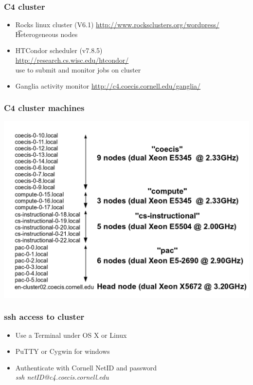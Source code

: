 \documentclass{beamer}
\begin{document}
\begin{frame}
  \frametitle{C4 cluster}

  \begin{itemize}
  \item Rocks linux cluster (V6.1)
  \url{http://www.rocksclusters.org/wordpress/}\\
  \t Heterogeneous nodes
  \item HTCondor scheduler (v7.8.5)\\
  \url{http://research.cs.wisc.edu/htcondor/}\\ 
  use to submit and monitor jobs on cluster
  \item Ganglia activity monitor
  \url{http://c4.coecis.cornell.edu/ganglia/}
  \end{itemize}
\end{frame}

\begin{frame}
  \frametitle{C4 cluster machines}
  \includegraphics[width=1\textwidth]{c4overview}
\end{frame}

\begin{frame}
  \frametitle{ssh access to cluster}

  \begin{itemize}
  \item Use a Terminal under OS X or Linux
  \item PuTTY or Cygwin for windows
  \item Authenticate with Cornell NetID and password \\
  \it{ssh netID@c4.coecis.cornell.edu}
  \end{itemize}
\end{frame}
\end{document}
